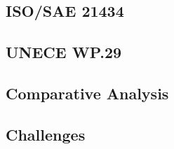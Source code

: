 \subsection{ISO/SAE 21434}\label{subsec:iso-sae-21434}
\subsection{UNECE WP.29}\label{subsec:unece-wp-29}
\subsection{Comparative Analysis}\label{subsec:comparative-analysis}
\subsection{Challenges}\label{subsec:future-needs-and-challenges}

%